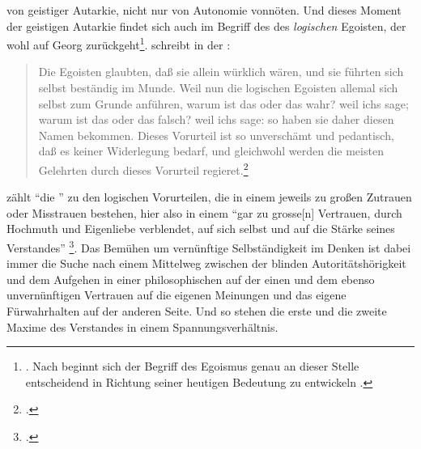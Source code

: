 von geistiger Autarkie, nicht nur von Autonomie vonnöten. Und dieses Moment der geistigen
Autarkie findet sich auch im Begriff des  des \emph{logischen} Egoisten, der
wohl auf Georg 
zurückgeht\footnote{\cite[Vgl.][64]{Hinske:ZwischenAufklaerungundVernunftkritik1993}.
Nach 
beginnt sich der Begriff des Egoismus genau an dieser Stelle entscheidend in
Richtung seiner heutigen Bedeutung zu entwickeln
\parencite[vgl.][39]{Hinske:PluralismusundPublikationsfreiheitimDenkenKants1986}.}.
 schreibt in der :
\begin{quote}
Die Egoisten glaubten, daß sie allein würklich wären, und sie führten sich
selbst beständig im Munde. Weil nun die logischen Egoisten allemal sich selbst zum
Grunde anführen, warum ist das oder das wahr? weil ichs sage; warum ist das oder
das falsch? weil ichs sage: so haben sie daher diesen Namen bekommen. Dieses
Vorurteil ist so unverschämt und pedantisch, daß es keiner Widerlegung bedarf,
und gleichwohl werden die meisten Gelehrten durch dieses Vorurteil
regieret.\footcite[][\S~202]{Meier:Vernunftlehre1752}
\end{quote}
 zählt \enquote{die } zu den logischen
Vorurteilen, die in einem jeweils zu großen Zutrauen oder Misstrauen bestehen,
hier also in einem \enquote{gar zu grosse[n] Vertrauen, durch Hochmuth und
Eigenliebe verblendet, auf sich selbst und auf die Stärke seines Verstandes}%
\footnote{\Cite[][\S~202]{Meier:Vernunftlehre1752}.}. Das Bemühen um vernünftige
Selbständigkeit im Denken ist dabei immer die Suche nach einem Mittelweg
zwischen der blinden Autoritätshörigkeit und dem Aufgehen in einer
philosophischen  auf der einen und dem ebenso unvernünftigen
Vertrauen auf die eigenen Meinungen und das eigene Fürwahrhalten auf der anderen
Seite. Und so stehen die erste und die zweite Maxime des Verstandes in einem
Spannungsverhältnis.

